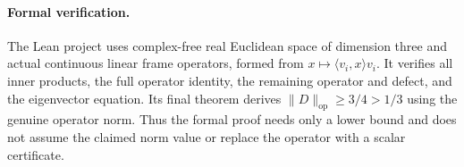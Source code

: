 \documentclass[11pt]{article}
\begin{document}
\paragraph{Formal verification.}
The Lean project uses complex-free real Euclidean space of dimension
three and actual continuous linear frame operators, formed from
$x\mapsto\langle v_i,x\rangle v_i$. It verifies all inner products,
the full operator identity, the remaining operator and defect, and the
eigenvector equation. Its final theorem derives
$\|D\|_{\mathrm{op}}\geq3/4>1/3$ using the genuine operator norm.
Thus the formal proof needs only a lower bound and does not assume the
claimed norm value or replace the operator with a scalar certificate.
\end{document}
